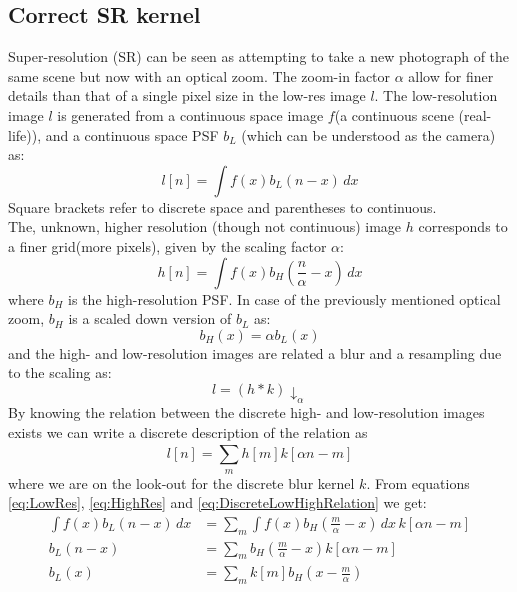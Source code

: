 \documentclass[11pt]{article}
\begin{document}
\subsection{Correct SR kernel}
Super-resolution (SR) can be seen as attempting to take a new photograph of the same scene but now with an optical zoom. The zoom-in factor $\alpha$ allow for finer details than that of a single pixel size in the low-res image $l$.
The low-resolution image $l$ is generated from a continuous space image $f$(a continuous scene (real-life)), and a continuous space PSF $b_L$ (which can be understood as the camera) as:
\begin{equation}
	l[n] = \int f(x) b_L (n-x)\,dx
	\label{eq:LowRes}
\end{equation}
Square brackets refer to discrete space and parentheses to continuous.\\
The, unknown, higher resolution (though not continuous) image $h$ corresponds to a finer grid(more pixels), given by the scaling factor $\alpha$:
\begin{equation}
	h[n] = \int f(x) b_H (\frac{n}{\alpha}-x)\, dx
	\label{eq:HighRes}
\end{equation}
where $b_H$ is the high-resolution PSF. In case of the previously mentioned optical zoom, $b_H$ is a scaled down version of $b_L$ as:
\begin{equation}
	b_H(x) = \alpha b_L(x)
	\label{eq:Scaling}
\end{equation}
and the high- and low-resolution images are related a blur and a resampling due to the scaling as:
\begin{equation}
	l = (h * k)\downarrow_{\alpha}
	\label{eq:BlurAndResampling}
\end{equation}
By knowing the relation between the discrete high- and low-resolution images exists we can write a discrete description of the relation as
\begin{equation}
	l[n] = \sum_{m}^{}h[m]k[\alpha n - m]
	\label{eq:DiscreteLowHighRelation}
\end{equation}
where we are on the look-out for the discrete blur kernel $k$.
From equations \ref{eq:LowRes}, \ref{eq:HighRes} and \ref{eq:DiscreteLowHighRelation} we get:
\begin{align}
	\int f(x) b_L (n-x) \, dx & = \sum_{m} \int f(x) b_H (\frac{m}{\alpha} - x) \, dx \, k[\alpha n - m]
	\label{eq:LinearCombo1}\\
	b_L(n-x) &= \sum_{m} b_H (\frac{m}{\alpha} - x) k [\alpha n - m] 
	\label{eq:LinearCombo2}\\
	b_L(x) &= \sum_{m} k[m] b_H (x - \frac{m}{\alpha})
	\label{eq:LinearCombo3}
\end{align}
\end{document}
